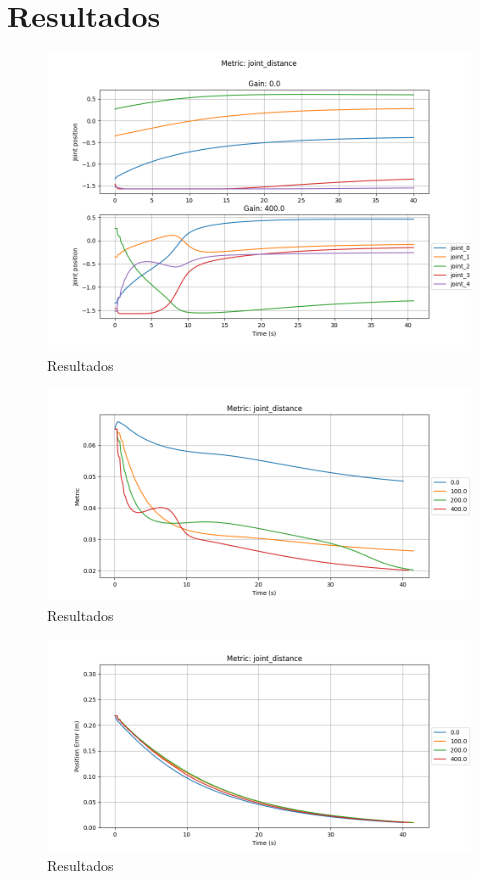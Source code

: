 \chapter{Resultados}\label{cap:results}

\begin{figure}
    \centering
    \includegraphics[width=1.0\textwidth]{Images/joint_distance/joint_states_joint_distance.png}
    \caption{Resultados}\label{fig:jd-js}
\end{figure}

\begin{figure}
    \centering
    \includegraphics[width=1.0\textwidth]{Images/joint_distance/metric_joint_distance.png}
    \caption{Resultados}\label{fig:jd-m}
\end{figure}

\begin{figure}
    \centering
    \includegraphics[width=1.0\textwidth]{Images/joint_distance/position_error_joint_distance.png}
    \caption{Resultados}\label{fig:jd-e}
\end{figure}

